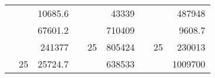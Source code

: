 \begin{table}[H]
\begin{tabular}{|ccrccrccc}
\rowcolor[HTML]{DAE8FC} 
\multicolumn{1}{|c|}{\cellcolor[HTML]{FFFFC7}}                                & \multicolumn{1}{c|}{\cellcolor[HTML]{DAE8FC}}                      & \multicolumn{1}{r|}{\cellcolor[HTML]{DAE8FC}10685.6}   & \multicolumn{1}{c|}{\cellcolor[HTML]{FFFFC7}}                                & \multicolumn{1}{c|}{\cellcolor[HTML]{DAE8FC}}                       & \multicolumn{1}{r|}{\cellcolor[HTML]{DAE8FC}43339}     & \multicolumn{1}{c|}{\cellcolor[HTML]{FFFFC7}}                                & \multicolumn{1}{c|}{\cellcolor[HTML]{DAE8FC}}                      & \multicolumn{1}{r|}{\cellcolor[HTML]{DAE8FC}487948}    \\ \cline{3-3} \cline{6-6} \cline{9-9} 
\multicolumn{1}{|c|}{\cellcolor[HTML]{FFFFC7}}                                & \multicolumn{1}{c|}{\cellcolor[HTML]{DAE8FC}}                      & \multicolumn{1}{r|}{\cellcolor[HTML]{DDFDFF}67601.2}   & \multicolumn{1}{c|}{\cellcolor[HTML]{FFFFC7}}                                & \multicolumn{1}{c|}{\cellcolor[HTML]{DAE8FC}}                       & \multicolumn{1}{r|}{\cellcolor[HTML]{DDFDFF}710409}    & \multicolumn{1}{c|}{\cellcolor[HTML]{FFFFC7}}                                & \multicolumn{1}{c|}{\cellcolor[HTML]{DAE8FC}}                      & \multicolumn{1}{r|}{\cellcolor[HTML]{DDFDFF}9608.7}    \\ \cline{3-3} \cline{6-6} \cline{9-9} 
\rowcolor[HTML]{DAE8FC} 
\multicolumn{1}{|c|}{\cellcolor[HTML]{FFFFC7}}                                & \multicolumn{1}{c|}{\cellcolor[HTML]{DAE8FC}}                      & \multicolumn{1}{r|}{\cellcolor[HTML]{DAE8FC}241377}    & \multicolumn{1}{c|}{\cellcolor[HTML]{FFFFC7}}                                & \multicolumn{1}{c|}{\multirow{-9}{*}{\cellcolor[HTML]{DAE8FC}25}}   & \multicolumn{1}{r|}{\cellcolor[HTML]{DAE8FC}805424}    & \multicolumn{1}{c|}{\cellcolor[HTML]{FFFFC7}}                                & \multicolumn{1}{c|}{\multirow{-9}{*}{\cellcolor[HTML]{DAE8FC}25}}  & \multicolumn{1}{r|}{\cellcolor[HTML]{DAE8FC}230013}    \\ \cline{3-3} \cline{5-6} \cline{8-9} 
\multicolumn{1}{|c|}{\cellcolor[HTML]{FFFFC7}}                                & \multicolumn{1}{c|}{\multirow{-10}{*}{\cellcolor[HTML]{DAE8FC}25}} & \multicolumn{1}{r|}{\cellcolor[HTML]{DDFDFF}25724.7}   & \multicolumn{1}{c|}{\cellcolor[HTML]{FFFFC7}}                                & \multicolumn{1}{c|}{\cellcolor[HTML]{DDFDFF}}                       & \multicolumn{1}{r|}{\cellcolor[HTML]{DAE8FC}638533}    & \multicolumn{1}{c|}{\cellcolor[HTML]{FFFFC7}}                                & \multicolumn{1}{c|}{\cellcolor[HTML]{DDFDFF}}                      & \multicolumn{1}{r|}{\cellcolor[HTML]{DAE8FC}1009700}   \\ \cline{2-3} \cline{6-6} \cline{9-9} 

\end{tabular}
\end{table}
